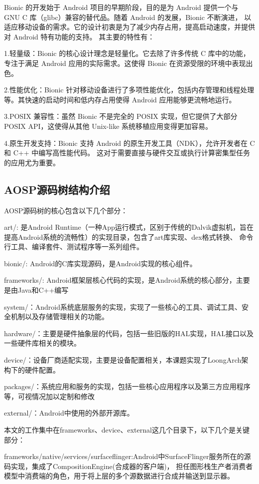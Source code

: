 Bionic 的开发始于 Android 项目的早期阶段，目的是为 Android 提供一个与 GNU C 库（glibc）兼容的替代品。随着 Android 的发展，Bionic 不断演进，
以适应移动设备的需求。它的设计初衷是为了减少内存占用，提高启动速度，并提供对 Android 特有功能的支持。
其主要的特性有：

1.轻量级：Bionic 的核心设计理念是轻量化。它去除了许多传统 C 库中的功能，专注于满足 Android 应用的实际需求。这使得 Bionic 
在资源受限的环境中表现出色。

2.性能优化：Bionic 针对移动设备进行了多项性能优化，包括内存管理和线程处理等。其快速的启动时间和低内存占用使得 
Android 应用能够更流畅地运行。

3.POSIX 兼容性：虽然 Bionic 不是完全的 POSIX 实现，但它提供了大部分 POSIX API，这使得从其他 Unix-like 
系统移植应用变得更加容易。

4.原生开发支持：Bionic 支持 Android 的原生开发工具（NDK），允许开发者在 C 和 C++ 中编写高性能代码。
这对于需要直接与硬件交互或执行计算密集型任务的应用尤为重要。

\subsection{AOSP源码树结构介绍}
AOSP源码树的核心包含以下几个部分：

  art/: 是Android Runtime（一种App运行模式，区别于传统的Dalvik虚拟机，旨在提高Android系统的流畅性）的实现目录，包含了art库实现、dex格式转换、
  命令行工具、编译套件、测试程序等一系列组件。

  bionic/: Android的C库实现源码，是Android实现的核心组件。

  frameworks/: Android框架层核心代码的实现，是Android系统的核心部分，主要是由Java和C++编写

  system/：Android系统底层服务的实现，实现了一些核心的工具、调试工具、安全机制以及存储管理相关的功能。

  hardware/：主要是硬件抽象层的代码，包括一些旧版的HAL实现，HAL接口以及一些硬件库相关的模块。

  device/：设备厂商适配实现，主要是设备配置相关，本课题实现了LoongArch架构下的硬件配置。

  packages/：系统应用和服务的实现，包括一些核心应用程序以及第三方应用程序等，可视情况加以定制和修改

  external/：Android中使用的外部开源库。

  本文的工作集中在frameworks、device、external这几个目录下，以下几个是关键部分：

  frameworks/native/services/surfaceflinger:Android中SurfaceFlinger服务所在的源码实现，集成了CompositionEngine(合成器的客户端)，
  担任图形栈生产者消费者模型中消费端的角色，用于将上层的多个源数据进行合成并输送到显示器。

